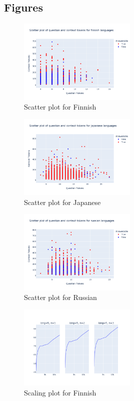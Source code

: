 \documentclass[11pt]{article}
\begin{document}
\subsection{Figures}
\label{sec:fig}
\begin{figure}[ht]
    \centering
    \includegraphics[width=0.5\textwidth]{week1_c_scatter_fi.png}
    \caption{Scatter plot for Finnish}
    \label{fig:scatter_week1_c_fi}
\end{figure}

\begin{figure}[ht]
    \centering
    \includegraphics[width=0.5\textwidth]{week1_c_scatter_ja.png}
    \caption{Scatter plot for Japanese}
    \label{fig:scatter_week1_c_ja}
\end{figure}

\begin{figure}[ht]
    \centering
    \includegraphics[width=0.5\textwidth]{week1_c_scatter_ru.png}
    \caption{Scatter plot for Russian}
    \label{fig:scatter_week1_c_ru}
\end{figure}

\begin{figure}[ht]
    \centering
    \includegraphics[width=0.5\textwidth]{week2_scaling_fi.png}
    \caption{Scaling plot for Finnish}
    \label{fig:week2_scaling_fi}
\end{figure}
\end{document}
